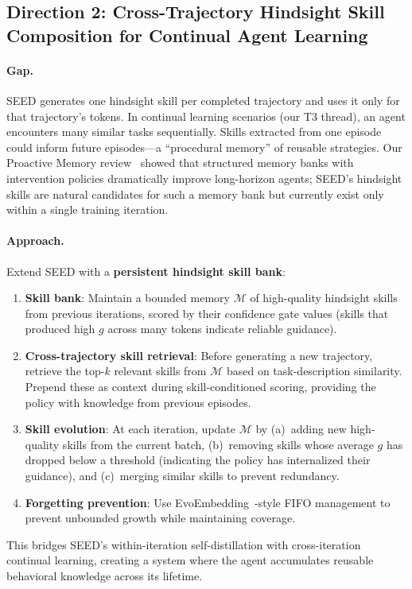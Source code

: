 \documentclass[11pt,a4paper]{article}
\begin{document}
\subsection{Direction 2: Cross-Trajectory Hindsight Skill Composition for Continual Agent Learning}

\paragraph{Gap.} SEED generates one hindsight skill per completed trajectory and uses it only for that trajectory's tokens. In continual learning scenarios (our T3 thread), an agent encounters many similar tasks sequentially. Skills extracted from one episode could inform future episodes---a ``procedural memory'' of reusable strategies. Our Proactive Memory review~\cite{proactivemem2026} showed that structured memory banks with intervention policies dramatically improve long-horizon agents; SEED's hindsight skills are natural candidates for such a memory bank but currently exist only within a single training iteration.

\paragraph{Approach.} Extend SEED with a \textbf{persistent hindsight skill bank}:
\begin{enumerate}
\item \textbf{Skill bank}: Maintain a bounded memory $\mathcal{M}$ of high-quality hindsight skills from previous iterations, scored by their confidence gate values (skills that produced high $g$ across many tokens indicate reliable guidance).
\item \textbf{Cross-trajectory skill retrieval}: Before generating a new trajectory, retrieve the top-$k$ relevant skills from $\mathcal{M}$ based on task-description similarity. Prepend these as context during skill-conditioned scoring, providing the policy with knowledge from previous episodes.
\item \textbf{Skill evolution}: At each iteration, update $\mathcal{M}$ by (a)~adding new high-quality skills from the current batch, (b)~removing skills whose average $g$ has dropped below a threshold (indicating the policy has internalized their guidance), and (c)~merging similar skills to prevent redundancy.
\item \textbf{Forgetting prevention}: Use EvoEmbedding~\cite{evoembedding2026}-style FIFO management to prevent unbounded growth while maintaining coverage.
\end{enumerate}
This bridges SEED's within-iteration self-distillation with cross-iteration continual learning, creating a system where the agent accumulates reusable behavioral knowledge across its lifetime.
\end{document}
